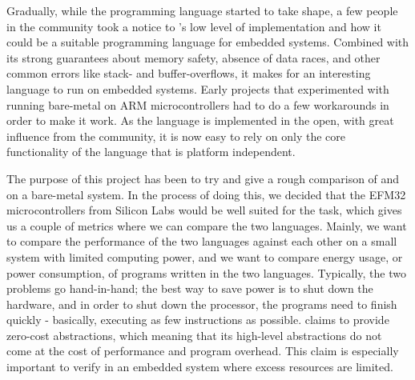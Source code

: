 Gradually, while the {\rust} programming language started to take shape, a few people in the community took a notice to {\rust}'s low level of implementation and how it could be a suitable programming language for embedded systems.
Combined with its strong guarantees about memory safety, absence of data races, and other common errors like stack- and buffer-overflows, it makes for an interesting language to run on embedded systems.
Early projects that experimented with running {\rust} bare-metal on ARM microcontrollers had to do a few workarounds in order to make it work.
As the language is implemented in the open, with great influence from the community, it is now easy to rely on only the core functionality of the language that is platform independent.

The purpose of this project has been to try and give a rough comparison of {\rust} and {\C} on a bare-metal system.
In the process of doing this, we decided that the EFM32 microcontrollers from Silicon Labs would be well suited for the task, which gives us a couple of metrics where we can compare the two languages.
Mainly, we want to compare the performance of the two languages against each other on a small system with limited computing power, and we want to compare energy usage, or power consumption, of programs written in the two languages.
Typically, the two problems go hand-in-hand; the best way to save power is to shut down the hardware, and in order to shut down the processor, the programs need to finish quickly - basically, executing as few instructions as possible.
{\rust} claims to provide zero-cost abstractions, which meaning that its high-level abstractions do not come at the cost of performance and program overhead.
This claim is especially important to verify in an embedded system where excess resources are limited.







